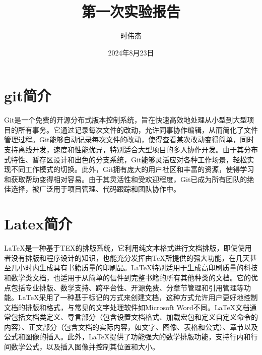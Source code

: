 \documentclass[a4paper, 12pt]{article}
\begin{document}
	\title{第一次实验报告}
	\author{时伟杰}
	\date{2024年8月23日}
	\maketitle
	\tableofcontents
	\newpage
	\section{git简介}
	‌‌Git是一个免费的开源分布式版本控制系统‌，旨在快速高效地处理从小型到大型项目的所有事务。它通过记录每次文件的改动，允许同事协作编辑，从而简化了文件管理过程。Git能够自动记录每次文件的改动，使得查看某次改动变得简单，同时支持离线开发，速度和性能优异，特别适合大型项目的多人协作开发。由于其分布式特性、暂存区设计和出色的分支系统，Git能够灵活应对各种工作场景，轻松实现不同工作模式的切换。此外，Git拥有庞大的用户社区和丰富的资源，使得学习和获取帮助变得相对容易。由于其灵活性和受欢迎程度，Git已成为所有团队的绝佳选择，被广泛用于项目管理、代码跟踪和团队协作中。‌
	\section{Latex简介}
	‌LaTeX‌是一种基于ΤΕΧ的排版系统，它利用纯文本格式进行文档排版，即使使用者没有排版和程序设计的知识，也能充分发挥由TeX所提供的强大功能，在几天甚至几小时内生成具有书籍质量的印刷品。LaTeX特别适用于生成高印刷质量的科技和数学类文档，也适用于从简单的信件到完整书籍的所有其他种类的文档。它的优点包括专业排版、数学支持、跨平台性、开源免费、分章节管理和引用管理等功能。LaTeX采用了一种基于标记的方式来创建文档，这种方式允许用户更好地控制文档的排版和格式，与常见的文字处理软件如Microsoft Word不同。LaTeX文档通常包括文档类定义、导言部分（包含设置文档格式、加载宏包和定义自定义命令的内容）、正文部分（包含文档的实际内容，如文字、图像、表格和公式）、章节以及公式和图像的插入。此外，LaTeX提供了功能强大的数学排版功能，支持行内和行间数学公式，以及插入图像并控制其位置和大小。
	
\end{document}
